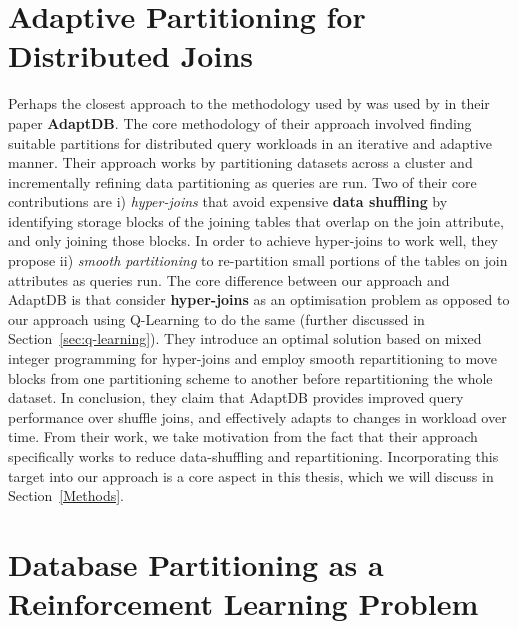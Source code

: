 
\section{Adaptive Partitioning for Distributed Joins}
Perhaps the closest approach to the methodology used by \citeauthor{Hilprecht:2019:TLP:3329859.3329876} was used by \citeauthor{DBLP:journals/pvldb/LuSJM17} in their paper \textbf{AdaptDB}. The core methodology of their approach involved finding suitable partitions for distributed query workloads in an iterative and adaptive manner. Their approach works by partitioning datasets across a cluster and incrementally refining data partitioning as queries are run. Two of their core contributions are i) \textit{hyper-joins} that avoid expensive \textbf{data shuffling} by identifying storage blocks of the joining tables that overlap on the join attribute, and only joining those blocks. In order to achieve hyper-joins to work well, they propose ii) \textit{smooth partitioning} to re-partition small portions of the tables on join attributes as queries run. 
The core difference between our approach and AdaptDB is that \citeauthor{DBLP:journals/pvldb/LuSJM17} consider \textbf{hyper-joins} as an optimisation problem as opposed to our approach using Q-Learning to do the same (further discussed in Section~\ref{sec:q-learning}). They introduce an optimal solution based on mixed integer programming for hyper-joins and employ smooth repartitioning to move blocks from one partitioning scheme to another before repartitioning the whole dataset. In conclusion, they claim that AdaptDB provides improved query performance over shuffle joins, and effectively adapts to changes in workload over time. From their work, we take motivation from the fact that their approach specifically works to reduce data-shuffling and repartitioning. Incorporating this target into our approach is a core aspect in this thesis, which we will discuss in Section~\ref{Methods}.


\section{Database Partitioning as a Reinforcement Learning Problem}
\label{db_partitioning}
